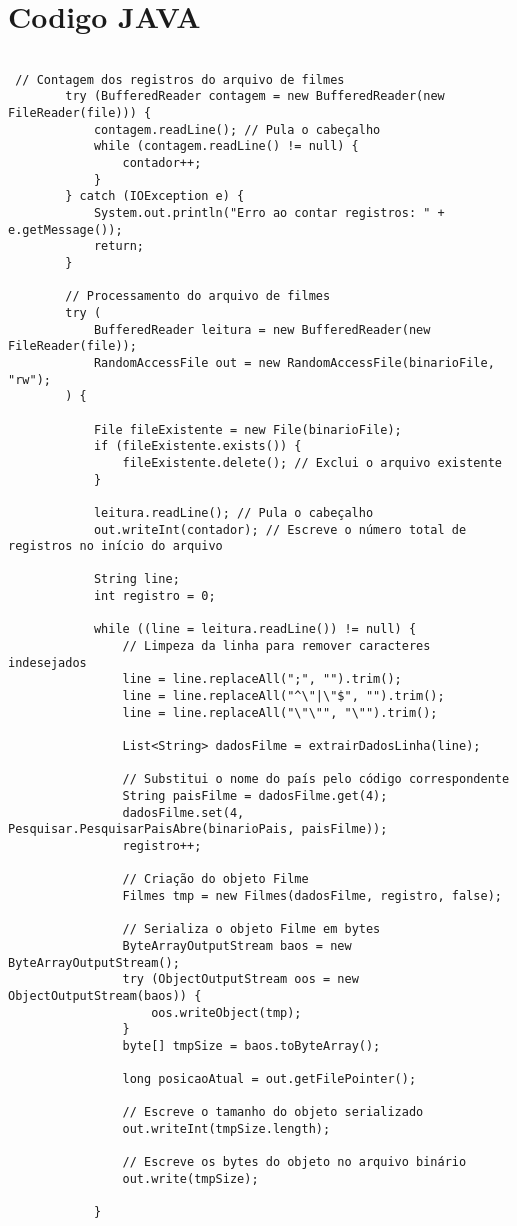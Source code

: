 \documentclass[12pt]{article}
\begin{document}
\section*{Codigo JAVA}
\begin{lstlisting}

 // Contagem dos registros do arquivo de filmes
        try (BufferedReader contagem = new BufferedReader(new FileReader(file))) {
            contagem.readLine(); // Pula o cabeçalho
            while (contagem.readLine() != null) {
                contador++;
            }
        } catch (IOException e) {
            System.out.println("Erro ao contar registros: " + e.getMessage());
            return;
        }
    
        // Processamento do arquivo de filmes
        try (
            BufferedReader leitura = new BufferedReader(new FileReader(file));
            RandomAccessFile out = new RandomAccessFile(binarioFile, "rw");
        ) {

            File fileExistente = new File(binarioFile);
            if (fileExistente.exists()) {
                fileExistente.delete(); // Exclui o arquivo existente
            }
            
            leitura.readLine(); // Pula o cabeçalho
            out.writeInt(contador); // Escreve o número total de registros no início do arquivo
    
            String line;
            int registro = 0;

            while ((line = leitura.readLine()) != null) {
                // Limpeza da linha para remover caracteres indesejados
                line = line.replaceAll(";", "").trim();
                line = line.replaceAll("^\"|\"$", "").trim();
                line = line.replaceAll("\"\"", "\"").trim();
    
                List<String> dadosFilme = extrairDadosLinha(line);
    
                // Substitui o nome do país pelo código correspondente
                String paisFilme = dadosFilme.get(4);
                dadosFilme.set(4, Pesquisar.PesquisarPaisAbre(binarioPais, paisFilme));
                registro++;
    
                // Criação do objeto Filme
                Filmes tmp = new Filmes(dadosFilme, registro, false);
    
                // Serializa o objeto Filme em bytes
                ByteArrayOutputStream baos = new ByteArrayOutputStream();
                try (ObjectOutputStream oos = new ObjectOutputStream(baos)) {
                    oos.writeObject(tmp);
                }
                byte[] tmpSize = baos.toByteArray();

                long posicaoAtual = out.getFilePointer();
    
                // Escreve o tamanho do objeto serializado
                out.writeInt(tmpSize.length);
                
                // Escreve os bytes do objeto no arquivo binário
                out.write(tmpSize);

            }

\end{lstlisting}
\end{document}
